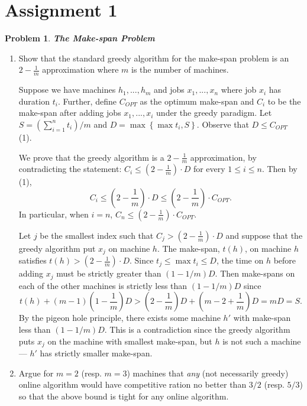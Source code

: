 \documentclass[11pt]{article}
\newtheorem{problem}{Problem}
\begin{document}
\rhead{\today}

\section*{Assignment 1}
\begin{problem}
\textbf{The Make-span Problem}
\end{problem}
\begin{enumerate}
\item Show that the standard greedy algorithm for the make-span problem is an $2 - \frac{1}{m}$ approximation where $m$ is the number of machines. 
\begin{prf}
Suppose we have machines $h_1, ..., h_m$ and jobs $x_1, ..., x_n$ where job $x_i$ has duration $t_i$. Further, define $C_{OPT}$ as the optimum make-span and $C_i$ to be the make-span after adding jobs $x_1, ..., x_i$ under the greedy paradigm. Let $S = \left(\sum_{i=1}^{n}t_i\right)/m$ and $D = \max \left\{ \max t_i, S \right\}$. Observe that $D \leq C_{OPT}$ (1). 

We prove that the greedy algorithm is a $2-\frac{1}{m}$ approximation, by contradicting the statement: $C_i \leq \left(2 - \frac{1}{m} \right) \cdot D$ for every $1 \leq i \leq n$. Then by (1), 
\[C_i \leq \left(2 - \frac{1}{m} \right) \cdot D \leq \left(2 - \frac{1}{m} \right) \cdot C_{OPT}.\] 
In particular, when $i = n$, $C_n \leq \left(2 - \frac{1}{m} \right) \cdot C_{OPT}$.

Let $j$ be the smallest index such that $C_j > \left(2 - \frac{1}{m} \right)\cdot D$ and suppose that the greedy algorithm put $x_j$ on machine $h$. The make-span, $t(h)$, on machine $h$ satisfies $t(h) > \left(2 - \frac{1}{m} \right)\cdot D$. Since $t_j \leq \max t_i \leq D$, the time on $h$ before adding $x_j$ must be strictly greater than $(1 - 1/m)D$. Then make-spans on each of the other machines is strictly less than $(1- 1/m)D$ since  
\[t(h) + (m-1)\left(1- \frac{1}{m}\right)D > \left(2 - \frac{1}{m} \right) D + \left(m - 2 + \frac{1}{m}\right)D = mD = S. \]
By the pigeon hole principle, there exists some machine $h'$ with make-span less than $(1 - 1/m)D$. This is a contradiction since the greedy algorithm puts $x_j$ on the machine with smallest make-span, but $h$ is not such a machine --- $h'$ has strictly smaller make-span.
\end{prf}
\item Argue for $m = 2$ (resp. $m=3$) machines that \emph{any} (not necessarily greedy) online algorithm would have competitive ration no better than $3/2$ (resp. $5/3$) so that the above bound is tight for any online algorithm.


\end{enumerate}
\end{document}
